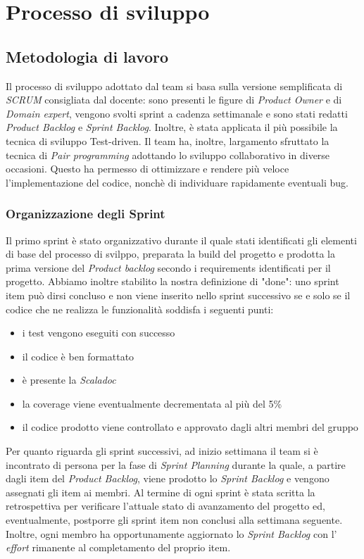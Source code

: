 \chapter{Processo di sviluppo}\label{ch:processo-di-sviluppo}
\section{Metodologia di lavoro}\label{sec:metodologia-di-lavoro}
Il processo di sviluppo adottato dal team si basa sulla versione semplificata di \textit{SCRUM} consigliata dal docente:
sono presenti le figure di \textit{Product Owner} e di \textit{Domain expert}, vengono svolti sprint a cadenza settimanale e sono stati redatti
\textit{Product Backlog} e \textit{Sprint Backlog}.
Inoltre, è stata applicata il più possibile la tecnica di sviluppo Test-driven.
Il team ha, inoltre, largamento sfruttato la tecnica di \textit{Pair programming} adottando lo sviluppo collaborativo in diverse occasioni.
Questo ha permesso di ottimizzare e rendere più veloce l'implementazione del codice, nonchè di individuare rapidamente eventuali bug.

\subsection{Organizzazione degli Sprint}\label{subsec:organizzazione-sprint}
Il primo sprint è stato organizzativo durante il quale stati identificati gli elementi di base del processo di svilppo, preparata la build del progetto e prodotta la prima versione del \textit{Product backlog}
secondo i requirements identificati per il progetto.
Abbiamo inoltre stabilito la nostra definizione di "done":
uno sprint item può dirsi concluso e non viene inserito nello sprint successivo se e solo se il codice che ne realizza le funzionalità soddisfa i seguenti punti:
\begin{itemize}
    \item i test vengono eseguiti con successo
    \item il codice è ben formattato
    \item è presente la \textit{Scaladoc}
    \item la coverage viene eventualmente decrementata al più del 5\%
    \item il codice prodotto viene controllato e approvato dagli altri membri del gruppo
\end{itemize}
Per quanto riguarda gli sprint successivi, ad inizio settimana il team si è incontrato di persona per la fase di \textit{Sprint Planning} durante la quale, a partire dagli item del \textit{Product Backlog}, viene prodotto
lo \textit{Sprint Backlog} e vengono assegnati gli item ai membri.
Al termine di ogni sprint è stata scritta la retrospettiva per verificare l'attuale stato di avanzamento del progetto ed, eventualmente,
postporre gli sprint item non conclusi alla settimana seguente.
Inoltre, ogni membro ha opportunamente aggiornato lo \textit{Sprint Backlog} con l' \textit{effort} rimanente al completamento del proprio item.

